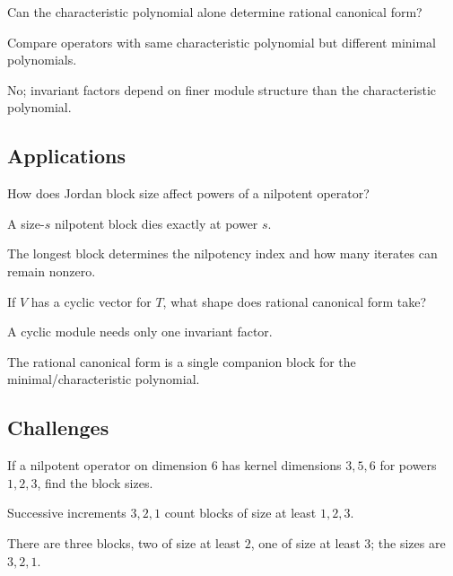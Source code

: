 \begin{exercise}\label{exr:i12-expand-12}
Can the characteristic polynomial alone determine rational canonical form?
\end{exercise}
\begin{hint}
Compare operators with same characteristic polynomial but different minimal polynomials.
\end{hint}
\begin{solution}
No; invariant factors depend on finer module structure than the characteristic polynomial.
\end{solution}

\subsection*{Applications}

\begin{exercise}\label{exr:i12-expand-13}
How does Jordan block size affect powers of a nilpotent operator?
\end{exercise}
\begin{hint}
A size-\(s\) nilpotent block dies exactly at power \(s\).
\end{hint}
\begin{solution}
The longest block determines the nilpotency index and how many iterates can remain nonzero.
\end{solution}

\begin{exercise}\label{exr:i12-expand-14}
If \(V\) has a cyclic vector for \(T\), what shape does rational canonical form take?
\end{exercise}
\begin{hint}
A cyclic module needs only one invariant factor.
\end{hint}
\begin{solution}
The rational canonical form is a single companion block for the minimal/characteristic polynomial.
\end{solution}

\subsection*{Challenges}

\begin{exercise}\label{exr:i12-expand-15}
If a nilpotent operator on dimension \(6\) has kernel dimensions \(3,5,6\) for powers \(1,2,3\), find the block sizes.
\end{exercise}
\begin{hint}
Successive increments \(3,2,1\) count blocks of size at least \(1,2,3\).
\end{hint}
\begin{solution}
There are three blocks, two of size at least \(2\), one of size at least \(3\); the sizes are \(3,2,1\).
\end{solution}

